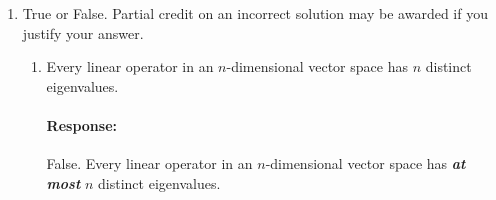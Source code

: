 \documentclass [11pt] {article}
\newcommand{\R}{\mathbb{R}}
\newcommand{\T}{\bf{T}}
\newcommand{\A}{\bf{A}}
\newcommand{\AT}{\bf{A$^{\T}$}}
\newcommand{\U}{\bf{U}}
\newcommand{\V}{\bf{V}}
\newenvironment{response}{\begin{responseframe}\vspace{-10pt}\paragraph{Response:}}{\end{responseframe}}
\renewcommand{\it}[1]{\textit{{#1}}}
\renewcommand{\bf}[1]{\textbf{{#1}}}
\newcommand{\ib}[1]{\it{\bf{{#1}}}}
\begin{document}
\begin{enumerate}
\begin{enumerate}
\begin{enumerate}[itemsep=10pt]
\begin{response}
                            Similarly, we can write $\AT \A \in \R^{n \times n}$ as
                            \begin{align*}
                                \AT \A &= \left( \U \Sigma \V^{\T} \right)^{\T} \left( \U \Sigma \V^{\T} \right) \\
                                       &= \left( \V^{\T} \right)^{\T} \Sigma^{\T} \U^{\T} \U \Sigma \V^{\T} \\
                                       &= \V \Sigma^{\T} \U^{\T} \U \Sigma \V ^{\T} \\
                                       &= \V \Sigma^{\T} \bf{I} \Sigma \V ^{\T} && \U \text{ is orthogonal} \\
                                       &= \V \Sigma^2 \V ^{\T} && \Sigma \text{ is diagonal}
                            \end{align*}
                            So, $\AT \A = \V \Sigma^2 \V^{\T}$, where $\V$ are the eigenvectors of 
                            \AT \A. Then, the right singular vectors of $\A$ are the eigenvectors of 
                            \AT \A.
                        \end{response}

                    \item What is the relationship between the singular values of $\A$ and the
                        eigenvalues of $\A \AT$? What about $\AT \A$?
                        \begin{response}
                            From the above part, we have that $\A \AT = \U \Sigma^2 \U^{\T}$ and
                            $\AT \A = \V \Sigma^2 \V^{\T}$. Then, the singular values of $\A$ are 
                            the square root of the eigenvalues of $\A \AT$ and $\AT \A$.
                        \end{response}
                \end{enumerate}
            \item True or False. Partial credit on an incorrect solution may be awarded if you
                justify your answer.
                \begin{enumerate}[itemsep=10pt]
                    \item Every linear operator in an $n$-dimensional vector space has $n$ distinct 
                        eigenvalues.
                        \begin{response}
                            False. Every linear operator in an $n$-dimensional vector space has 
                            \ib{at most} $n$ distinct eigenvalues.
                        \end{response}


\end{enumerate}
\end{enumerate}
\end{enumerate}
\end{document}
